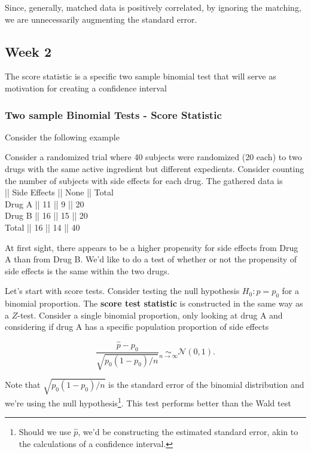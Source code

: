 \documentclass{homework}
\begin{document}
Since, generally, matched data is positively correlated, by ignoring the matching, we are unnecessarily augmenting the standard error. 

\clearpage

\subsection{Week 2}

The score statistic is a specific two sample binomial test that will serve as motivation for creating a confidence interval

\subsubsection{Two sample Binomial Tests - Score Statistic}

Consider the following example

\begin{tcolorbox}[title=Example]

Consider a randomized trial where 40 subjects were randomized (20 each) to two drugs with the same active ingredient but different expedients. Consider counting the number of subjects with side effects for each drug. The gathered data is\\ 
    || Side Effects || None || Total \\
Drug A || 11 || 9 || 20 \\
Drug B || 16 || 15 || 20 \\
Total || 16 || 14 || 40 \\
\end{tcolorbox}

At first sight, there appears to be a higher propensity for side effects from Drug A than from Drug B. We'd like to do a test of whether or not the propensity of side effects is the same within the two drugs. 

Let's start with score tests. Consider testing the null hypothesis $H_0 : p = p_0$ for a binomial proportion. The \textbf{score test statistic} is constructed in the same way as a $Z$-test. Consider a single binomial proportion, only looking at drug A and considering if drug A has a specific population proportion of side effects

$$
\frac{\hat{p}-p_0}{\sqrt{p_0(1-p_0)/n}} \underset{n \rightarrow \infty}{\sim} \mathcal{N}(0,1).
$$

Note that $\sqrt{p_0(1-p_0)/n}$ is the standard error of the binomial distribution and we're using the null hypothesis\footnote{Should we use $\hat{p}$, we'd be constructing the estimated standard error, akin to the calculations of a confidence interval.}. This test performs better than the Wald test
\end{document}
